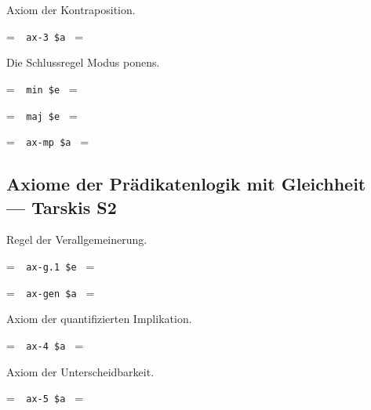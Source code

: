\noindent Axiom der Kontraposition.

\setbox\startprefix=\hbox{\tt \ \ ax-3\ \$a\ }
\setbox\contprefix=\hbox{\tt \ \ \ \ \ \ \ \ \ \ }
\startm
\m{\vdash}\m{(}\m{(}\m{\lnot}\m{\varphi}\m{\rightarrow}\m{\lnot}\m{\psi}\m{)}\m{
\rightarrow}\m{(}\m{\psi}\m{\rightarrow}\m{\varphi}\m{)}\m{)}
\endm


\noindent Die Schlussregel Modus ponens.\label{axmp}

\setbox\startprefix=\hbox{\tt \ \ min\ \$e\ }
\setbox\contprefix=\hbox{\tt \ \ \ \ \ \ \ \ \ }
\startm
\m{\vdash}\m{\varphi}
\endm

\setbox\startprefix=\hbox{\tt \ \ maj\ \$e\ }
\setbox\contprefix=\hbox{\tt \ \ \ \ \ \ \ \ \ }
\startm
\m{\vdash}\m{(}\m{\varphi}\m{\rightarrow}\m{\psi}\m{)}
\endm

\setbox\startprefix=\hbox{\tt \ \ ax-mp\ \$a\ }
\setbox\contprefix=\hbox{\tt \ \ \ \ \ \ \ \ \ \ \ }
\startm
\m{\vdash}\m{\psi}
\endm


\subsection{Axiome der Prädikatenlogik mit Gleichheit\\--- Tarskis S2}

\noindent Regel der Verallgemeinerung.

\setbox\startprefix=\hbox{\tt \ \ ax-g.1\ \$e\ }
\setbox\contprefix=\hbox{\tt \ \ \ \ \ \ \ \ \ \ \ \ }
\startm
\m{\vdash}\m{\varphi}
\endm

\setbox\startprefix=\hbox{\tt \ \ ax-gen\ \$a\ }
\setbox\contprefix=\hbox{\tt \ \ \ \ \ \ \ \ \ \ \ \ }
\startm
\m{\vdash}\m{\forall}\m{\varphi}
\endm

\noindent Axiom der quantifizierten Implikation.

\setbox\startprefix=\hbox{\tt \ \ ax-4\ \$a\ }
\setbox\contprefix=\hbox{\tt \ \ \ \ \ \ \ \ \ \ }
\startm
\m{\vdash}\m{(}\m{\forall}\m{(}\m{\forall}\m{\varphi}\m{\rightarrow}\m{
\psi}\m{)}\m{\rightarrow}\m{(}\m{\forall}\m{\varphi}\m{\rightarrow}\m{
\forall}\m{\psi}\m{)}\m{)}
\endm

\noindent Axiom der Unterscheidbarkeit.

\setbox\startprefix=\hbox{\tt \ \ ax-5\ \$a\ }
\setbox\contprefix=\hbox{\tt \ \ \ \ \ \ \ \ \ \ }
\startm
\m{\vdash}\m{(}\m{\varphi}\m{\rightarrow}\m{\forall}\m{\varphi}\m{)}
\m{ }\m{ }\m{ }\m{\varphi}\m{ }\m{(}\m{ }\m{ }\m{ }\m{\varphi}
\m{ }\m{ }\m{)}
\endm

